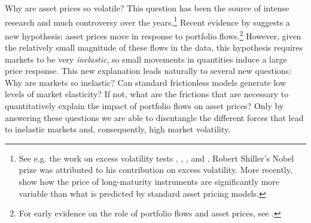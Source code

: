 \newpage
\setcounter{page}{1}

\doublespacing

Why are asset prices so volatile? 
This question has been the source of intense research and much controversy over the years.\footnote{See e.g. the work on excess volatility tests \citet{leroy1981present}, \citet{shiller1983stock}, \citet{shiller1992market}, and \citet{cochrane1992explaining}. Robert Shiller's Nobel prize was attributed to his contribution on excess volatility. 
More recently, \citet{giglio2018excess} show how the price of long-maturity instruments are significantly more variable than what is predicted by standard asset pricing models. }
Recent evidence by \citet{gabaix2020search} suggests a new hypothesis: asset prices move in response to portfolio flows.\footnote{For early evidence on the role of portfolio flows and asset prices, see \citet{deuskar2011market}.}
However, given the relatively small magnitude of these flows in the data, this hypothesis requires markets to be very \textit{inelastic}, so small movements in quantities induce a large price response. 
This new explanation leads naturally to several new questions: Why are markets so inelastic? Can standard frictionless models generate low levels of market elasticity? 
If not, what are the frictions that are necessary to quantitatively explain the impact of portfolio flows on asset prices? 
Only by answering these questions we are able to disentangle the different forces that lead to inelastic markets and, consequently, high market volatility. 



